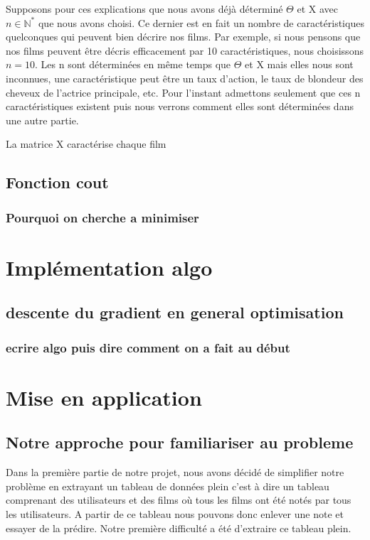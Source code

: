 \documentclass[a4paper,10pt]{article}
\begin{document}
Supposons pour ces explications que nous avons déjà déterminé $\Theta$ et X avec $n \in \mathbb{N}^*$ que nous avons choisi. Ce dernier est en fait un nombre de caractéristiques quelconques qui peuvent bien décrire nos films. Par exemple, si nous pensons que nos films peuvent être décris efficacement par 10 caractéristiques, nous choisissons $n = 10$.
Les n sont déterminées en même temps que $\Theta$ et X mais elles nous sont inconnues, une caractéristique peut être un taux d'action, le taux de blondeur des cheveux de l'actrice principale, etc. Pour l'instant admettons seulement que ces n caractéristiques existent puis nous verrons comment elles sont déterminées dans une autre partie.

La matrice X caractérise chaque film




\subsection{Fonction cout}
\subsubsection{Pourquoi on cherche a minimiser}
\section{Implémentation algo}
\subsection{descente du gradient en general optimisation}
\subsubsection{ecrire algo puis dire comment on a fait au début}
\section{Mise en application}
\subsection{Notre approche pour familiariser au probleme}
Dans la première partie de notre projet, nous avons décidé de simplifier notre problème en extrayant un tableau de données 
plein c'est à dire un tableau comprenant des utilisateurs et des films où tous les films ont été notés par tous les utilisateurs. 
A partir de ce tableau nous pouvons donc enlever une note et essayer de la prédire. 
Notre première difficulté a été d'extraire ce tableau plein.
\end{document}
